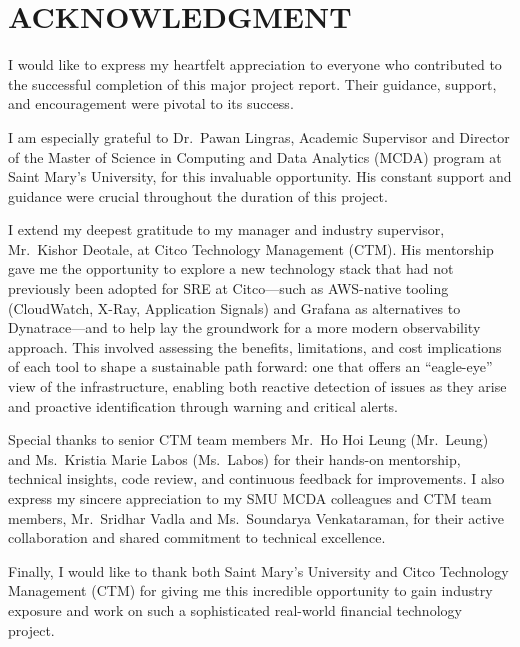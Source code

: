 \chapter*{ACKNOWLEDGMENT}

I would like to express my heartfelt appreciation to everyone who contributed to the successful completion of this major project report. Their guidance, support, and encouragement were pivotal to its success.

I am especially grateful to Dr.\ Pawan Lingras, Academic Supervisor and Director of the Master of Science in Computing and Data Analytics (MCDA) program at Saint Mary's University, for this invaluable opportunity. His constant support and guidance were crucial throughout the duration of this project.

I extend my deepest gratitude to my manager and industry supervisor, Mr.\ Kishor Deotale, at Citco Technology Management (CTM). His mentorship gave me the opportunity to explore a new technology stack that had not previously been adopted for SRE at Citco---such as AWS-native tooling (CloudWatch, X-Ray, Application Signals) and Grafana as alternatives to Dynatrace---and to help lay the groundwork for a more modern observability approach. This involved assessing the benefits, limitations, and cost implications of each tool to shape a sustainable path forward: one that offers an ``eagle-eye'' view of the infrastructure, enabling both reactive detection of issues as they arise and proactive identification through warning and critical alerts.

Special thanks to senior CTM team members Mr.\ Ho Hoi Leung (Mr.\ Leung) and Ms.\ Kristia Marie Labos (Ms.\ Labos) for their hands-on mentorship, technical insights, code review, and continuous feedback for improvements. I also express my sincere appreciation to my SMU MCDA colleagues and CTM team members, Mr.\ Sridhar Vadla and Ms.\ Soundarya Venkataraman, for their active collaboration and shared commitment to technical excellence.

Finally, I would like to thank both Saint Mary's University and Citco Technology Management (CTM) for giving me this incredible opportunity to gain industry exposure and work on such a sophisticated real-world financial technology project.

\clearpage
